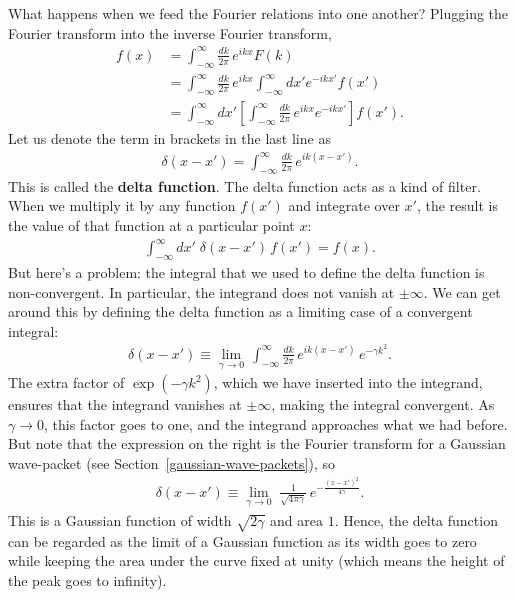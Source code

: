 \documentclass[10pt,a4paper]{article}
\begin{document}
What happens when we feed the Fourier relations into one another?
Plugging the Fourier transform into the inverse Fourier transform,
\begin{align}
  f(x) &= \int_{-\infty}^\infty \frac{dk}{2\pi} \, e^{ikx} F(k) \\
  &= \int_{-\infty}^\infty \frac{dk}{2\pi} \, e^{ikx} \int_{-\infty}^\infty dx' e^{-ikx'} f(x')\\
  &= \int_{-\infty}^\infty dx' \left[ \int_{-\infty}^\infty \frac{dk}{2\pi} \, e^{ikx}  e^{-ikx'} \right] f(x').
\end{align}
Let us denote the term in brackets in the last line as
\begin{align}
  \delta(x-x') = \int_{-\infty}^\infty \frac{dk}{2\pi} \, e^{ik(x-x')}.
\end{align}
This is called the \textbf{delta function}. The delta function acts as
a kind of filter. When we multiply it by any function $f(x')$ and
integrate over $x'$, the result is the value of that function at a
particular point $x$:
\begin{align}
  \int_{-\infty}^\infty dx'\; \delta(x-x')\, f(x') = f(x).
\end{align}
But here's a problem: the integral that we used to define the delta
function is non-convergent. In particular, the integrand does not
vanish at $\pm \infty$.  We can get around this by defining the delta
function as a limiting case of a convergent integral:
\begin{align}
  \delta(x-x') \equiv \lim_{\gamma \rightarrow 0} \, \int_{-\infty}^\infty \frac{dk}{2\pi} \, e^{ik(x-x')} \, e^{-\gamma k^2}.
\end{align}
The extra factor of $\exp(-\gamma k^2)$, which we have inserted into
the integrand, ensures that the integrand vanishes at $\pm \infty$,
making the integral convergent. As $\gamma \rightarrow 0$, this factor
goes to one, and the integrand approaches what we had before. But note
that the expression on the right is the Fourier transform for a
Gaussian wave-packet (see Section~\ref{gaussian-wave-packets}), so
\begin{align}
  \delta(x-x') \equiv \lim_{\gamma \rightarrow 0} \; \frac{1}{\sqrt{4\pi\gamma}} \, e^{-\frac{(x-x')^2}{4\gamma}}.
\end{align}
This is a Gaussian function of width $\sqrt{2\gamma}$ and area $1$.
Hence, the delta function can be regarded as the limit of a Gaussian
function as its width goes to zero while keeping the area under the
curve fixed at unity (which means the height of the peak goes to
infinity).
\end{document}

